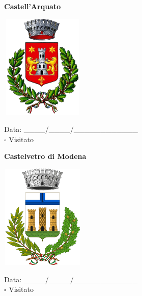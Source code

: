 \documentclass[a5paper,12pt]{article}
\begin{document}
\newpage

\noindent
\begin{minipage}[t]{0.45\textwidth}
    \begin{center}
        \textbf{Castell'Arquato}
    \end{center}
    \vspace{-0.5cm} %
    \begin{center}
        \includegraphics[height= 5cm, width=4cm]{Emilia Romagna/Stemma Castell Arquato.png}
    \end{center}
    \vspace{-0.4cm} %
    \begin{flushleft}
        Data: \_\_\_\_/\_\_\_\_/\_\_\_\_\_\_\_\_\_\_\_\_ \\
        $\square$ Visitato
    \end{flushleft}
\end{minipage}
\hfill
\noindent
\begin{minipage}[t]{0.45\textwidth}
    \begin{center}
        \textbf{Castelvetro di Modena}
    \end{center}
    \vspace{-0.5cm} %
    \begin{center}
        \includegraphics[height= 5cm, width=4cm]{Emilia Romagna/Stemma Castelvetro di Modena.png}
    \end{center}
    \vspace{-0.4cm} %
    \begin{flushleft}
        Data: \_\_\_\_/\_\_\_\_/\_\_\_\_\_\_\_\_\_\_\_\_ \\
        $\square$ Visitato
    \end{flushleft}
\end{minipage}
\end{document}
